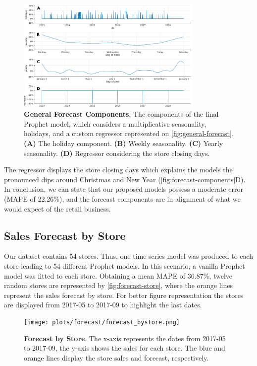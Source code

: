 \begin{figure}[!htb]
  \centering
  \includegraphics[width=0.8\textwidth]{plots/forecast/forecast_prophet-components.png}
  \caption[General Forecast Components]{\textbf{General Forecast Components}. The components of the final Prophet model, which considers a multiplicative seasonality, holidays, and a custom regressor represented on \autoref{fig:general-forecast}. \textbf{(A)} The holiday component. \textbf{(B)} Weekly seasonality. \textbf{(C)} Yearly seasonality. \textbf{(D)} Regressor considering the store closing days.}
  \label{fig:forecast-components}
\end{figure}

The regressor displays the store closing days which explains the models the pronounced dips around Christmas and New Year (\autoref{fig:forecast-components}D). In conclusion, we can state that our proposed models possess a moderate error (MAPE of 22.26\%), and the forecast components are in alignment of what we would expect of the retail business.   

\subsection[Sales Forecast by Store]{Sales Forecast by Store}
\label{sec:forecast-store}

Our dataset contains 54 stores. Thus, one time series model was produced to each store leading to 54 different Prophet models. In this scenario, a vanilla Prophet model was fitted to each store. Obtaining a mean MAPE of 36.87\%, twelve random stores are represented by \autoref{fig:forecast-store}, where the orange lines represent the sales forecast by store. For better figure representation the stores are displayed from 2017-05 to 2017-09 to highlight the last dates. 

\begin{figure}[!htb]
  \centering
  \texttt{[image: plots/forecast/forecast\_bystore.png]}
  \caption[Forecast by Store]{\textbf{Forecast by Store}. The x-axis represents the dates from 2017-05 to 2017-09, the y-axis shows the sales for each store. The blue and orange lines display the store sales and forecast, respectively.}
  \label{fig:forecast-store}
\end{figure}

